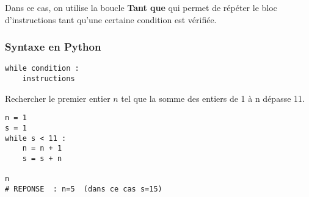 Dans ce cas, on utilise la boucle \textbf{Tant que} qui permet de répéter le bloc d'instructions 
tant qu'une certaine condition est vérifiée.


\vspace{1cm}



\subsubsection{Syntaxe en Python}


\begin{lstlisting}
while condition :
    instructions
\end{lstlisting}



\vspace{0.5cm}
\label{ex-suite}
Rechercher le premier entier $n$ tel que la somme des entiers de 1 à n dépasse 11.

\begin{lstlisting}
n = 1
s = 1
while s < 11 :
    n = n + 1
    s = s + n
    
n
# REPONSE  : n=5  (dans ce cas s=15)
\end{lstlisting}


